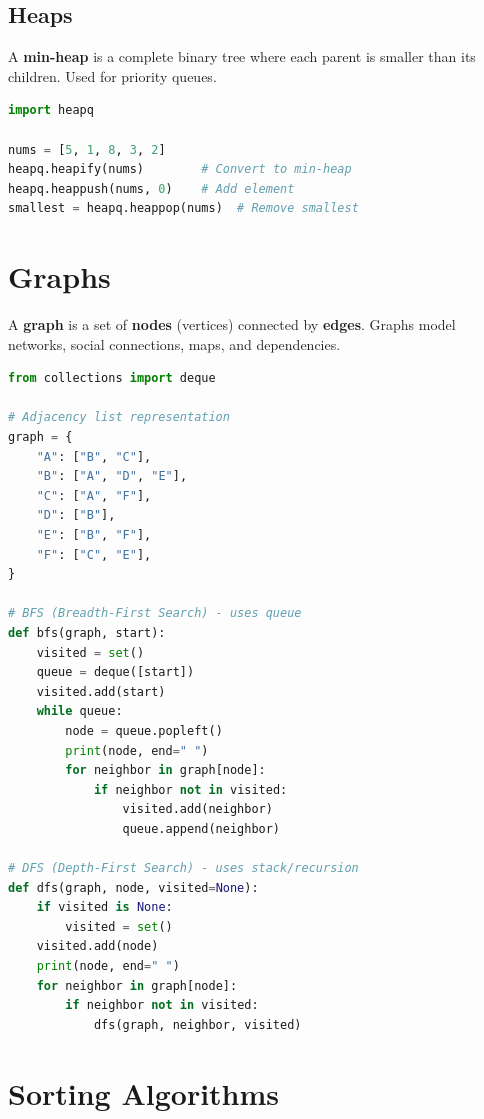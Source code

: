\documentclass[12pt, a4paper, oneside]{book}
\begin{document}
\subsection{Heaps}
A \textbf{min-heap} is a complete binary tree where each parent is smaller than its children. Used for priority queues.

\begin{lstlisting}[language=Python, caption={Python heap usage}]
import heapq

nums = [5, 1, 8, 3, 2]
heapq.heapify(nums)        # Convert to min-heap
heapq.heappush(nums, 0)    # Add element
smallest = heapq.heappop(nums)  # Remove smallest
\end{lstlisting}

\section{Graphs}

A \textbf{graph} is a set of \textbf{nodes} (vertices) connected by \textbf{edges}. Graphs model networks, social connections, maps, and dependencies.

\begin{lstlisting}[language=Python, caption={Graph representation and BFS/DFS}]
from collections import deque

# Adjacency list representation
graph = {
    "A": ["B", "C"],
    "B": ["A", "D", "E"],
    "C": ["A", "F"],
    "D": ["B"],
    "E": ["B", "F"],
    "F": ["C", "E"],
}

# BFS (Breadth-First Search) - uses queue
def bfs(graph, start):
    visited = set()
    queue = deque([start])
    visited.add(start)
    while queue:
        node = queue.popleft()
        print(node, end=" ")
        for neighbor in graph[node]:
            if neighbor not in visited:
                visited.add(neighbor)
                queue.append(neighbor)

# DFS (Depth-First Search) - uses stack/recursion
def dfs(graph, node, visited=None):
    if visited is None:
        visited = set()
    visited.add(node)
    print(node, end=" ")
    for neighbor in graph[node]:
        if neighbor not in visited:
            dfs(graph, neighbor, visited)
\end{lstlisting}

\section{Sorting Algorithms}
\end{document}
